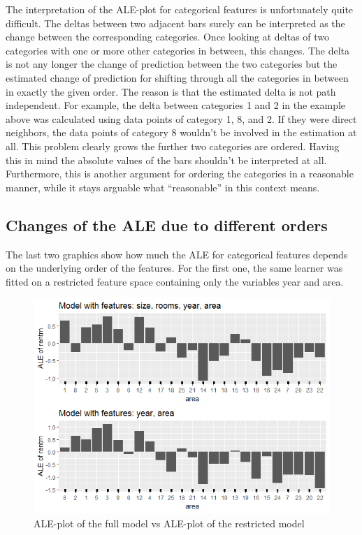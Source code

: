 \documentclass[]{krantz}
\begin{document}
The interpretation of the ALE-plot for categorical features is
unfortunately quite difficult. The deltas between two adjacent bars
surely can be interpreted as the change between the corresponding
categories. Once looking at deltas of two categories with one or more
other categories in between, this changes. The delta is not any longer
the change of prediction between the two categories but the estimated
change of prediction for shifting through all the categories in between
in exactly the given order. The reason is that the estimated delta is
not path independent. For example, the delta between categories 1 and 2
in the example above was calculated using data points of category 1, 8,
and 2. If they were direct neighbors, the data points of category 8
wouldn't be involved in the estimation at all. This problem clearly
grows the further two categories are ordered. Having this in mind the
absolute values of the bars shouldn't be interpreted at all.
Furthermore, this is another argument for ordering the categories in a
reasonable manner, while it stays arguable what ``reasonable'' in this
context means.

\subsection{Changes of the ALE due to different
orders}\label{changes-of-the-ale-due-to-different-orders}

The last two graphics show how much the ALE for categorical features
depends on the underlying order of the features. For the first one, the
same learner was fitted on a restricted feature space containing only
the variables year and area.

\begin{figure}
\includegraphics[width=1\linewidth]{images/ALE_2_cat_different_features_} \caption{ALE-plot of the full model vs ALE-plot of the
restricted model}\label{fig:ALE2catrestrmod}
\end{figure}
\end{document}
